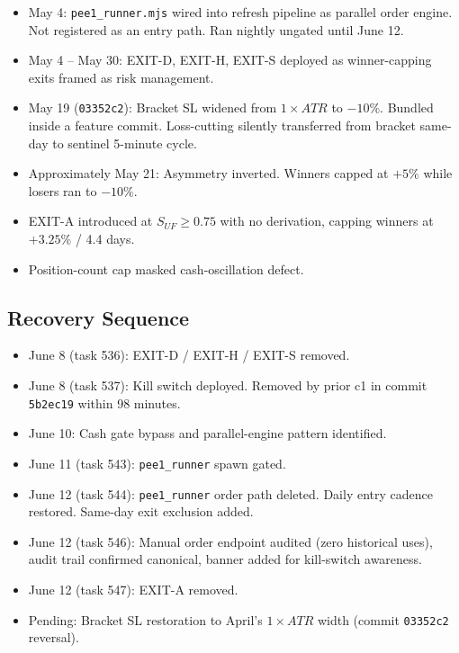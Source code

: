 \documentclass[11pt, a4paper]{article}
\theoremstyle{definition}
\begin{document}
\begin{itemize}
\item May 4: \texttt{pee1\_runner.mjs} wired into refresh pipeline as
parallel order engine. Not registered as an entry path. Ran nightly
ungated until June 12.

\item May 4 -- May 30: EXIT-D, EXIT-H, EXIT-S deployed as winner-capping
exits framed as risk management.

\item May 19 (\texttt{03352c2}): Bracket SL widened from $1\!\times\!ATR$
to $-10\%$. Bundled inside a feature commit. Loss-cutting silently
transferred from bracket same-day to sentinel 5-minute cycle.

\item Approximately May 21: Asymmetry inverted. Winners capped at $+5\%$
while losers ran to $-10\%$.

\item EXIT-A introduced at $S_{UF} \geq 0.75$ with no derivation, capping
winners at $+3.25\%$ / 4.4 days.

\item Position-count cap masked cash-oscillation defect.
\end{itemize}

\subsection{Recovery Sequence}

\begin{itemize}
\item June 8 (task 536): EXIT-D / EXIT-H / EXIT-S removed.
\item June 8 (task 537): Kill switch deployed. Removed by prior c1 in
commit \texttt{5b2ec19} within 98 minutes.
\item June 10: Cash gate bypass and parallel-engine pattern identified.
\item June 11 (task 543): \texttt{pee1\_runner} spawn gated.
\item June 12 (task 544): \texttt{pee1\_runner} order path deleted.
Daily entry cadence restored. Same-day exit exclusion added.
\item June 12 (task 546): Manual order endpoint audited (zero historical
uses), audit trail confirmed canonical, banner added for kill-switch
awareness.
\item June 12 (task 547): EXIT-A removed.
\item Pending: Bracket SL restoration to April's $1\!\times\!ATR$ width
(commit \texttt{03352c2} reversal).
\end{itemize}
\end{document}
